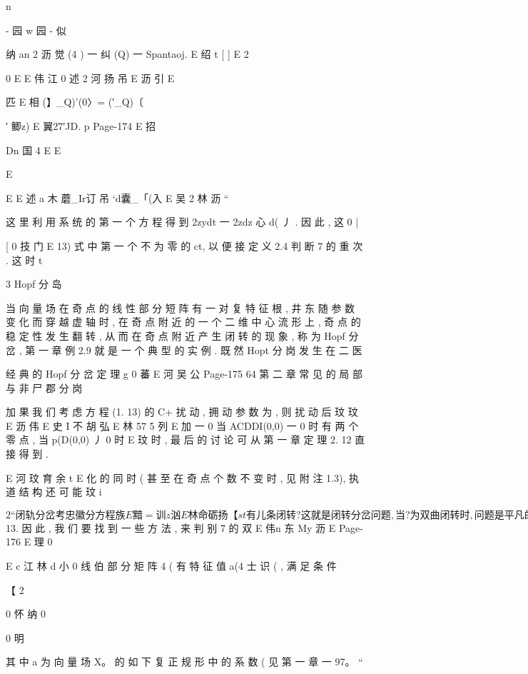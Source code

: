 {{{{{{{{{{{{{{{{{{n

- 园 w 园 - 似

纳 an 2 沥
觉 (4 ) 一 纠 (Q) 一 Spantaoj.
E 绍 t [ ] E 2

0
E
E 伟 江
0 述 2 河 扬 吊
E 沥 引
E

匹 E
相 (】_Q)'(0〉= (′_Q)〔

′ 鲫z) E 翼27′JD.
p
Page-174
E 招

Dn 国 4
E
E

E

E
E 述 a 木
蘑_Ir订 吊 `d囊_「(入 E 吴 2 林
沥 “

这 里 利 用 系 统 的 第 一 个 方 程 得 到 2zydt 一 2zdz 心 d( 丿 . 因 此 , 这
0 |

[
0 技 门
E
13) 式 中 第 一 个 不 为 零 的 ct, 以 便 接 定 义 2.4 判 断 7 的 重 次 . 这 时
t

3 Hopf 分 岛

当 向 量 场 在 奇 点 的 线 性 部 分 短 阵 有 一 对 复 特 征 根 , 井 东 随 参
数 变 化 而 穿 越 虚 轴 时 , 在 奇 点 附 近 的 一 个 二 维 中 心 流 形 上 , 奇 点 的
稳 定 性 发 生 翻 转 , 从 而 在 奇 点 附 近 产 生 闭 转 的 现 象 , 称 为 Hopf 分
岔 , 第 一 章 例 2.9 就 是 一 个 典 型 的 实 例 . 既 然 Hopt 分 岗 发 生 在 二
医

经 典 的 Hopf 分 岔 定 理
g
0 蕃 E 河 吴 公
Page-175
64 第 二 章 常 见 的 局 部 与 非 尸 郡 分 岗

加 果 我 们 考 虑 方 程 (1. 13) 的 C+ 扰 动 , 拥 动 参 数 为 , 则 扰 动 后
玟
玟
E 沥 伟
E 史 I 不 胡 弘
E 林 57 5 列
E
加 一 0 当 ACDDI(0,0) 一 0 时 有 两 个 零 点 , 当 p(D(0,0) 丿 0 时
E
玟
时 , 最 后 的 讨 论 可 从 第 一 章 定 理 2. 12 直 接 得 到 .

E 河 玟 育 余 t
E
化 的 同 时 ( 甚 至 在 奇 点 个 数 不 变 时 , 见 附 注 1.3), 执 道 结 构 还 可 能
玟
i

$ 2 “ 闭 轨 分 岔

考 忠 徽 分 方 程 族
E 黯=训z汹%

E 林 命 砺 扬
【 s t
有 儿 条 闭 转 ? 这 就 是 闭 转 分 岔 问 题 , 当 ? 为 双 曲 闭 转 时 , 问 题 是 平
凡 的 ( 见 第 一 章 $ 13. 因 此 , 我 们 要 找 到 一 些 方 法 , 来 判 别 7 的 双
E 伟n 东
My 沥
E
Page-176
E 理 0

E c 江 林 d 小 0
线 伯 部 分 矩 阵 4 ( 有 特 征 值 a(4 士 识 ( , 满 足 条 件

【 2

0 怀 纳 0

0 明

其 中 a 为 向 量 场 X。 的 如 下 复 正 规 形 中 的 系 数 ( 见 第 一 章
一 97。 “

}}}}}}}}}}}}}}}}}}
